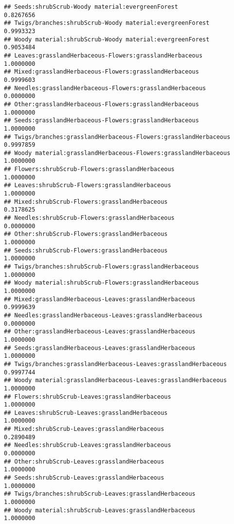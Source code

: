 \documentclass[
]{article}
\begin{document}
\begin{verbatim}
## Seeds:shrubScrub-Woody material:evergreenForest                       0.8267656
## Twigs/branches:shrubScrub-Woody material:evergreenForest              0.9993323
## Woody material:shrubScrub-Woody material:evergreenForest              0.9053484
## Leaves:grasslandHerbaceous-Flowers:grasslandHerbaceous                1.0000000
## Mixed:grasslandHerbaceous-Flowers:grasslandHerbaceous                 0.9999603
## Needles:grasslandHerbaceous-Flowers:grasslandHerbaceous               0.0000000
## Other:grasslandHerbaceous-Flowers:grasslandHerbaceous                 1.0000000
## Seeds:grasslandHerbaceous-Flowers:grasslandHerbaceous                 1.0000000
## Twigs/branches:grasslandHerbaceous-Flowers:grasslandHerbaceous        0.9997859
## Woody material:grasslandHerbaceous-Flowers:grasslandHerbaceous        1.0000000
## Flowers:shrubScrub-Flowers:grasslandHerbaceous                        1.0000000
## Leaves:shrubScrub-Flowers:grasslandHerbaceous                         1.0000000
## Mixed:shrubScrub-Flowers:grasslandHerbaceous                          0.3178625
## Needles:shrubScrub-Flowers:grasslandHerbaceous                        0.0000000
## Other:shrubScrub-Flowers:grasslandHerbaceous                          1.0000000
## Seeds:shrubScrub-Flowers:grasslandHerbaceous                          1.0000000
## Twigs/branches:shrubScrub-Flowers:grasslandHerbaceous                 1.0000000
## Woody material:shrubScrub-Flowers:grasslandHerbaceous                 1.0000000
## Mixed:grasslandHerbaceous-Leaves:grasslandHerbaceous                  0.9999639
## Needles:grasslandHerbaceous-Leaves:grasslandHerbaceous                0.0000000
## Other:grasslandHerbaceous-Leaves:grasslandHerbaceous                  1.0000000
## Seeds:grasslandHerbaceous-Leaves:grasslandHerbaceous                  1.0000000
## Twigs/branches:grasslandHerbaceous-Leaves:grasslandHerbaceous         0.9997744
## Woody material:grasslandHerbaceous-Leaves:grasslandHerbaceous         1.0000000
## Flowers:shrubScrub-Leaves:grasslandHerbaceous                         1.0000000
## Leaves:shrubScrub-Leaves:grasslandHerbaceous                          1.0000000
## Mixed:shrubScrub-Leaves:grasslandHerbaceous                           0.2890489
## Needles:shrubScrub-Leaves:grasslandHerbaceous                         0.0000000
## Other:shrubScrub-Leaves:grasslandHerbaceous                           1.0000000
## Seeds:shrubScrub-Leaves:grasslandHerbaceous                           1.0000000
## Twigs/branches:shrubScrub-Leaves:grasslandHerbaceous                  1.0000000
## Woody material:shrubScrub-Leaves:grasslandHerbaceous                  1.0000000

\end{verbatim}
\end{document}
